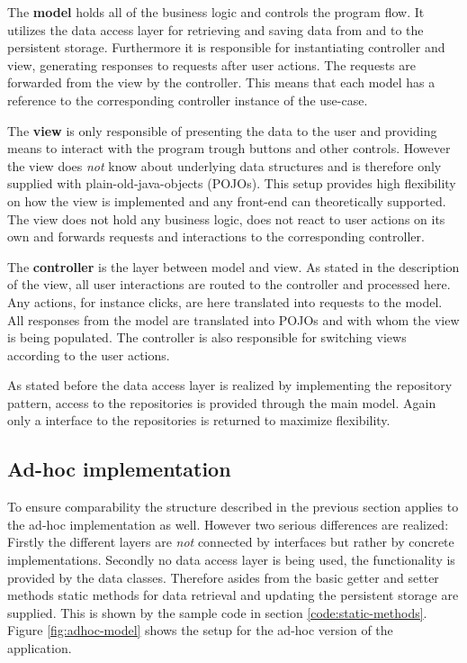 The \textbf{model} holds all of the business logic and controls the program flow. It utilizes the data access layer for retrieving and saving data from and to the persistent storage. Furthermore it is responsible for instantiating controller and view, generating responses to requests after user actions. The requests are forwarded from the view by the controller. This means that each model has a reference to the corresponding controller instance of the use-case. 

The \textbf{view} is only responsible of presenting the data to the user and providing means to interact with the program trough buttons and other controls. However the view does \emph{not} know about underlying data structures and is therefore only supplied with plain-old-java-objects (POJOs). This setup provides high flexibility on how the view is implemented and any front-end can theoretically supported. The view does not hold any business logic, does not react to user actions on its own and forwards requests and interactions to the corresponding controller. 

The \textbf{controller} is the layer between model and view. As stated in the description of the view, all user interactions are routed to the controller and processed here. Any actions, for instance clicks, are here translated into requests to the model. All responses from the model are translated into POJOs and with whom the view is being populated. The controller is also responsible for switching views according to the user actions.

As stated before the data access layer is realized by implementing the repository pattern, access to the repositories is provided through the main model.  Again only a interface to the repositories is returned to maximize flexibility.

\subsection{Ad-hoc implementation}
\label{sec:ad-hoc}
To ensure comparability the structure described in the previous section applies to the ad-hoc implementation as well. However two serious differences are realized: Firstly the different layers are \emph{not} connected by interfaces but rather by concrete implementations. Secondly no data access layer is being used, the functionality is provided by the data classes. Therefore asides from the basic getter and setter methods static methods for data retrieval and updating the persistent storage are supplied. This is shown by the sample code in section \ref{code:static-methods}. Figure \ref{fig:adhoc-model} shows the setup for the ad-hoc version of the application. 


